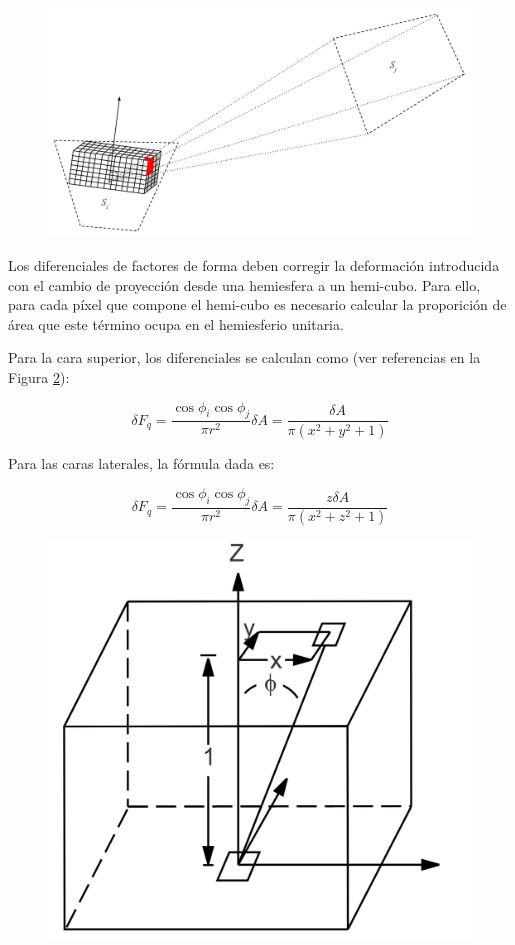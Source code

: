 \vspace{5mm}
\begin{figure}[!ht]
	\centering
	\includegraphics[width=0.8\linewidth]{assets/Hemicube}
	\label{img:ff3}
\end{figure}

Los diferenciales de factores de forma deben corregir la deformación introducida con el cambio de proyección desde una hemiesfera a un hemi-cubo. Para ello, para cada píxel que compone el hemi-cubo es necesario calcular la proporición de área que este término ocupa en el hemiesferio unitaria.

Para la cara superior, los diferenciales se calculan como (ver referencias en la Figura \ref{img:deltaff}):

\begin{equation}
	\delta{F_{q}} = \frac{\cos{\phi_{i}}\cos{\phi_{j}}}{\pi{r^{2}}} \delta{A} = \frac{\delta{A}}{\pi({x^{2} + y^{2} + 1})} 
\end{equation}

Para las caras laterales, la fórmula dada es:

\begin{equation}
\delta{F_{q}} = \frac{\cos{\phi_{i}}\cos{\phi_{j}}}{\pi{r^{2}}}\delta{A} = \frac{z\delta{A}}{\pi({x^{2} + z^{2} + 1})}
\end{equation}

\begin{figure}[H]
	\centering
	\includegraphics[width=0.4\linewidth]{assets/deltaff}
	\label{img:deltaff}
\end{figure}


